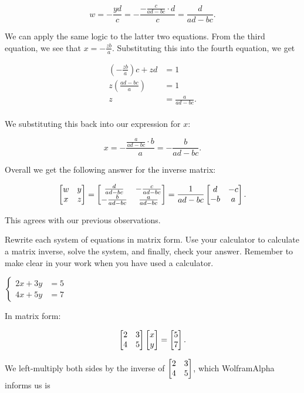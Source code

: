 \documentclass[../gatm_answers.tex]{subfiles}
\begin{document}
$$w=-\frac{yd}{c}=-\frac{-\frac{c}{ad-bc}\cdot d}{c} = \frac{d}{ad-bc}.$$

We can apply the same logic to the latter two equations. From the third equation, we see that $x = -\frac{zb}{a}$. Substituting this into the fourth equation, we get

\begin{align*}
  \left(-\frac{zb}{a}\right)c+zd &= 1 \\
  z\left(\frac{ad-bc}{a}\right) &= 1 \\
  z &= \frac{a}{ad-bc}. \\
\end{align*}

We substituting this back into our expression for $x$:

$$x = -\frac{\frac{a}{ad-bc}\cdot b}{a} = -\frac{b}{ad-bc}.$$

Overall we get the following answer for the inverse matrix:

$$\begin{bmatrix} w & y \\ x & z \end{bmatrix} = \begin{bmatrix} \frac{d}{ad-bc} & -\frac{c}{ad-bc} \\ -\frac{b}{ad-bc} & \frac{a}{ad-bc} \end{bmatrix} = \frac{1}{ad-bc}\begin{bmatrix} d & -c \\ -b & a \end{bmatrix}.$$

This agrees with our previous observations.

\begin{outer_problem}
\item Rewrite each system of equations in matrix form. Use your calculator to calculate a matrix inverse, solve the system, and finally, check your answer. Remember to make clear in your work when you have used a calculator.
\end{outer_problem}

\begin{inner_problem}[start=1]
\item $\begin{cases} 2x+3y &= 5 \\ 4x+5y &= 7 \end{cases}$
\end{inner_problem}

In matrix form:

$$\begin{bmatrix} 2 & 3 \\ 4 & 5 \end{bmatrix}\begin{bmatrix} x \\ y \end{bmatrix} = \begin{bmatrix} 5 \\ 7 \end{bmatrix}.$$

We left-multiply both sides by the inverse of $\begin{bmatrix} 2 & 3 \\ 4 & 5 \end{bmatrix}$, which WolframAlpha informs us is
\end{document}
